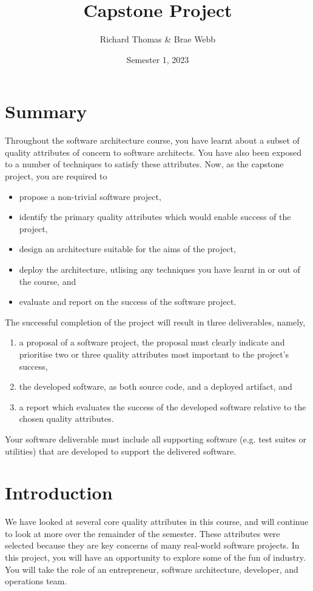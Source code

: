 \documentclass{csse4400}
\title{Capstone Project}
\author{Richard Thomas \& Brae Webb}
\date{Semester 1, 2023}
\begin{document}
\maketitle

\section*{Summary}
Throughout the software architecture course,
you have learnt about a subset of quality attributes of concern to software architects.
You have also been exposed to a number of techniques to satisfy these attributes.
Now, as the capstone project, you are required to
\begin{itemize}
    \item propose a non-trivial software project,
    \item identify the primary quality attributes which would enable success of the project,
    \item design an architecture suitable for the aims of the project,
    \item deploy the architecture, utlising any techniques you have learnt in or out of the course, and
    \item evaluate and report on the success of the software project.
\end{itemize}

\noindent
The successful completion of the project will result in three deliverables, namely,
\begin{enumerate}[label=\roman*]
    \item a proposal of a software project, the proposal must clearly indicate and prioritise two or three quality attributes most important to the project's success,
    \item the developed software, as both source code, and a deployed artifact, and
    \item a report which evaluates the success of the developed software relative to the chosen quality attributes.
\end{enumerate}

\noindent
Your software deliverable must include all supporting software (e.g. test suites or utilities) that are developed to support the delivered software.

\section{Introduction}
We have looked at several core quality attributes in this course, and will continue to look at more over the remainder of the semester.
These attributes were selected because they are key concerns of many real-world software projects.
In this project, you will have an opportunity to explore some of the fun of industry.
You will take the role of an entrepreneur, software architecture, developer, and operations team.
\end{document}
